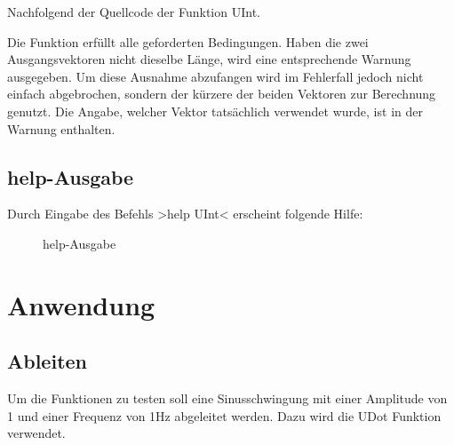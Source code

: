 \documentclass[%
  a4paper, %
  12pt, %
   article, %
  titlepage
]{scrartcl}
\begin{document}
Nachfolgend der Quellcode der Funktion UInt.
 


\newpage

Die Funktion erfüllt alle geforderten Bedingungen. Haben die zwei Ausgangsvektoren nicht dieselbe Länge, wird eine entsprechende Warnung ausgegeben.
Um diese Ausnahme abzufangen wird im Fehlerfall jedoch nicht einfach abgebrochen, sondern der kürzere der beiden Vektoren zur Berechnung genutzt.
Die Angabe, welcher Vektor tatsächlich verwendet wurde, ist in der Warnung enthalten.

 \subsection{help-Ausgabe}

Durch Eingabe des Befehls >help UInt< erscheint folgende Hilfe:

\begin{figure}[h]
\caption{help-Ausgabe}
\label{fig2}
\end{figure}

\newpage

  \section{Anwendung}
  \subsection{Ableiten}

Um die Funktionen zu testen soll eine Sinusschwingung mit einer Amplitude von 1 und einer Frequenz von 1Hz abgeleitet werden.
Dazu wird die UDot Funktion verwendet.
\end{document}

